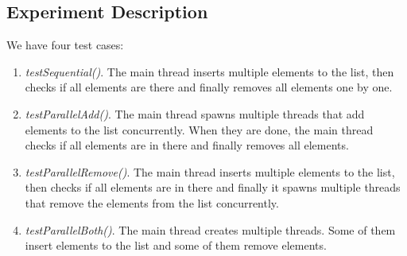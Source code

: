 \subsection{Experiment Description}
\par
We have four test cases:
\par
\begin{enumerate}
\item \textit{testSequential()}. The main thread inserts multiple elements to
the list, then checks if all elements are there and finally removes all elements
one by one.
\item \textit{testParallelAdd()}. The main thread spawns multiple threads that
add elements to the list concurrently. When they are done, the main thread
checks if all elements are in there and finally removes all elements.
\item \textit{testParallelRemove()}. The main thread inserts multiple elements
to the list, then checks if all elements are in there and finally it spawns
multiple threads that remove the elements from the list concurrently.
\item \textit{testParallelBoth()}. The main thread creates multiple threads.
Some of them insert elements to the list and some of them remove elements.
\end{enumerate}
\par
